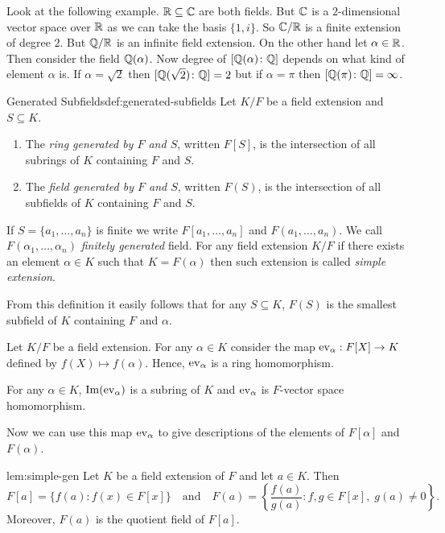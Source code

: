 Look at the following example. $\mathbb{R}\subseteq \mathbb{C}$ are both fields. But $\mathbb{C}$ is a $2$-dimensional vector space over $\mathbb{R}$ as we can take the basis $\{1,i\}$.
So $\mathbb{C}/\mathbb{R}$ is a finite extension of degree $2$. 
But $\mathbb{Q}/\mathbb{R}$ is an infinite field extension. 
On the other hand let $\alpha\in \mathbb{R}$. Then consider the field $\mathbb{Q}(\alpha)$. 
Now degree of  $[\mathbb{Q}(\alpha)\colon \mathbb{Q}]$ depends on what kind of element $\alpha$ is. If $\alpha=\sqrt{2}$ then $[\mathbb{Q}(\sqrt{2})\colon \mathbb{Q}]=2$ but if $\alpha=\pi$ then $[\mathbb{Q}(\pi)\colon \mathbb{Q}]=\infty$.

\begin{Definition}{Generated Subfields}{def:generated-subfields}
  Let $K/F$ be a field extension and $S\subseteq K$.
  \begin{enumerate}[label=(\roman*)]
    \item The \emph{ring generated by $F$ and $S$}, written $F[S]$, is the intersection of all subrings of $K$ containing $F$ and $S$.
    \item The \emph{field generated by $F$ and $S$}, written $F(S)$, is the intersection of all subfields of $K$ containing $F$ and $S$.
  \end{enumerate}
  If $S=\{a_1,\ldots,a_n\}$ is finite we write $F[a_1,\ldots,a_n]$ and $F(a_1,\ldots,a_n)$. 
  We call $F(\alpha_1,\dots, \alpha_n)$ \emph{finitely generated} field. 
  For any field extension $K/F$ if there exists an element $\alpha\in K$ such that $K=F(\alpha)$ then such extension is called \emph{simple extension}.
\end{Definition}
From this definition it easily follows that for any $S\subseteq K$, $F(S)$ is the smallest subfield of $K$ containing $F$ and $\alpha$.

Let $K/F$ be a field extension. 
For any $\alpha\in K$ consider the map $\operatorname{ev}_{\alpha}:F[X]\to K$ defined by $f(X)\mapsto f(\alpha)$. 
Hence, $\operatorname{ev}_{\alpha}$ is a ring homomorphism.
\begin{observation}
  For any $\alpha\in K$, $\operatorname{Im}(\operatorname{ev}_{\alpha})$ is a subring of $K$ and $\operatorname{ev}_{\alpha}$ is $F$-vector space homomorphism.
\end{observation}

Now we can use this map $\operatorname{ev}_{\alpha}$ to give descriptions of the elements of $F[\alpha]$ and $F(\alpha)$. 
\begin{lemma}{}{lem:simple-gen}
  Let $K$ be a field extension of $F$ and let $a\in K$. Then
  \[
    F[a] = \{f(a) : f(x)\in F[x]\}
    \quad\text{and}\quad
    F(a) = \left\{\frac{f(a)}{g(a)} : f,g\in F[x],\; g(a)\neq 0\right\}.
  \]
  Moreover, $F(a)$ is the quotient field of $F[a]$.
\end{lemma}

